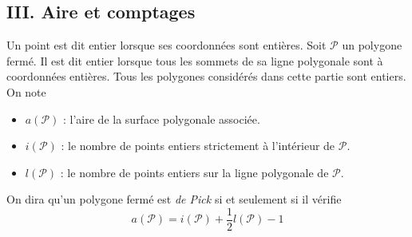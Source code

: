 \subsection*{III. Aire et comptages}
Un point est dit entier lorsque ses coordonnées sont entières. Soit $\mathcal P$ un polygone fermé. Il est dit entier lorsque tous les sommets de sa ligne polygonale sont à coordonnées entières. Tous les polygones considérés dans cette partie sont entiers. On note
\begin{itemize}
 \item $a(\mathcal{P})$ : l'aire de la surface polygonale associée.
 \item $i(\mathcal{P})$ : le nombre de points entiers strictement à l'intérieur de $\mathcal P$.
 \item $l(\mathcal{P})$ : le nombre de points entiers sur la ligne polygonale de $\mathcal P$.
\end{itemize}
On dira qu'un polygone fermé est \emph{de Pick} si et seulement si il vérifie
\begin{displaymath}
 a(\mathcal{P}) = i(\mathcal{P}) +\frac{1}{2}l(\mathcal{P}) -1
\end{displaymath}

